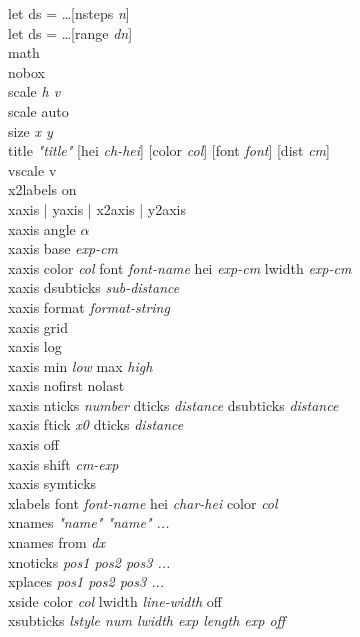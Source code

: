 {\sf let ds = \ldots [nsteps {\it n}]} \\
{\sf let ds = \ldots [range {\it dn}]} \\
{\sf math } \\
{\sf nobox } \\
{\sf scale {\it h v}} \\
{\sf scale auto} \\
{\sf size {\it x y }}\\
{\sf title {\it "title"}  [hei {\it ch-hei}] [color {\it col}] [font {\it font}] [dist {\it cm}]  }   \\
{\sf vscale v} \\
{\sf x2labels on} \\
{\sf xaxis | yaxis | x2axis | y2axis}\\
{\sf xaxis angle $\alpha$} \\
{\sf xaxis base {\it exp-cm}}  \\
{\sf xaxis color {\it col} font {\it font-name}  hei {\it exp-cm} lwidth {\it exp-cm}} \\
{\sf xaxis dsubticks {\it sub-distance} }  \\
{\sf xaxis format {\it format-string} } \\
{\sf xaxis grid }  \\
{\sf xaxis log}  \\
{\sf xaxis min {\it low} max {\it high}}  \\
{\sf xaxis nofirst nolast}  \\
{\sf xaxis nticks {\it number} dticks {\it distance} dsubticks {\it distance}} \\
{\sf xaxis ftick {\it x0} dticks {\it distance}} \\
{\sf xaxis off}  \\
{\sf xaxis shift {\it cm-exp}}  \\
{\sf xaxis symticks} \\
{\sf xlabels font {\it font-name} hei {\it char-hei} color {\it col} }\\
{\sf xnames {\it "name"  "name" ...}}  \\
{\sf xnames from {\it dx}}  \\
{\sf xnoticks {\it pos1 pos2 pos3 ...}}  \\
{\sf xplaces {\it pos1 pos2 pos3 ...}}  \\
{\sf xside color {\it col} lwidth {\it line-width} off  } \\
{\sf xsubticks {\it {\sf lstyle} num  {\sf lwidth} exp {\sf length} exp  {\sf off}}} \\
